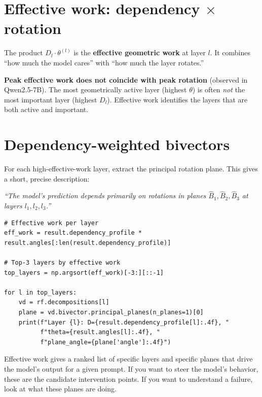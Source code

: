 \documentclass[11pt, twoside, openright]{memoir}
\begin{document}
\section{Effective work: dependency $\times$ rotation}

The product $D_l \cdot \theta^{(l)}$ is the \textbf{effective geometric
work} at layer $l$.  It combines ``how much the model cares'' with
``how much the layer rotates.''

\begin{finding}
\textbf{Peak effective work does not coincide with peak rotation}
(observed in Qwen2.5-7B).
The most geometrically active layer (highest $\theta$) is often
\emph{not} the most important layer (highest $D_l$).  Effective work
identifies the layers that are both active and important.
\end{finding}

\section{Dependency-weighted bivectors}

For each high-effective-work layer, extract the principal rotation plane.
This gives a short, precise description:

\emph{``The model's prediction depends primarily on rotations in planes
$\hat{B}_1, \hat{B}_2, \hat{B}_3$ at layers $l_1, l_2, l_3$.''}

\begin{lstlisting}[caption={Identifying the functionally relevant planes}]
# Effective work per layer
eff_work = result.dependency_profile * result.angles[:len(result.dependency_profile)]

# Top-3 layers by effective work
top_layers = np.argsort(eff_work)[-3:][::-1]

for l in top_layers:
    vd = rf.decompositions[l]
    plane = vd.bivector.principal_planes(n_planes=1)[0]
    print(f"Layer {l}: D={result.dependency_profile[l]:.4f}, "
          f"theta={result.angles[l]:.4f}, "
          f"plane_angle={plane['angle']:.4f}")
\end{lstlisting}

\begin{transformer}
Effective work gives a ranked list of specific layers and specific
planes that drive the model's output for a given prompt.  If you want
to steer the model's behavior, these are the candidate intervention
points.  If you want to
understand a failure, look at what these planes are doing.
\end{transformer}
\end{document}
